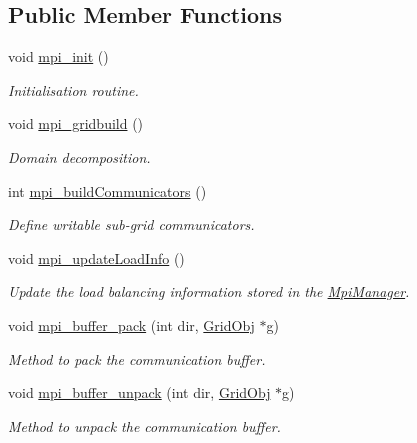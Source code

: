 \subsection*{Public Member Functions}
\begin{DoxyCompactItemize}
\item 
void \hyperlink{class_mpi_manager_a02adaa06e139dfca2bc71e1a1dbf25c7}{mpi\+\_\+init} ()
\begin{DoxyCompactList}\small\item\em Initialisation routine. \end{DoxyCompactList}\item 
void \hyperlink{class_mpi_manager_a7f07e85131147b55eec643c791ec2ba0}{mpi\+\_\+gridbuild} ()
\begin{DoxyCompactList}\small\item\em Domain decomposition. \end{DoxyCompactList}\item 
int \hyperlink{class_mpi_manager_a749fa958cb7343183a69ca6191b45286}{mpi\+\_\+build\+Communicators} ()
\begin{DoxyCompactList}\small\item\em Define writable sub-\/grid communicators. \end{DoxyCompactList}\item 
void \hyperlink{class_mpi_manager_ae6a8b1a857a00cdc4ed115512db050f4}{mpi\+\_\+update\+Load\+Info} ()
\begin{DoxyCompactList}\small\item\em Update the load balancing information stored in the \hyperlink{class_mpi_manager}{Mpi\+Manager}. \end{DoxyCompactList}\item 
void \hyperlink{class_mpi_manager_ae1b33a4a24d9abf528528a296aa1d92d}{mpi\+\_\+buffer\+\_\+pack} (int dir, \hyperlink{class_grid_obj}{Grid\+Obj} $\ast$g)
\begin{DoxyCompactList}\small\item\em Method to pack the communication buffer. \end{DoxyCompactList}\item 
void \hyperlink{class_mpi_manager_abf5e0511918b4ae6ec524d737618e341}{mpi\+\_\+buffer\+\_\+unpack} (int dir, \hyperlink{class_grid_obj}{Grid\+Obj} $\ast$g)
\begin{DoxyCompactList}\small\item\em Method to unpack the communication buffer. \end{DoxyCompactList}\item 

\end{DoxyCompactItemize}

